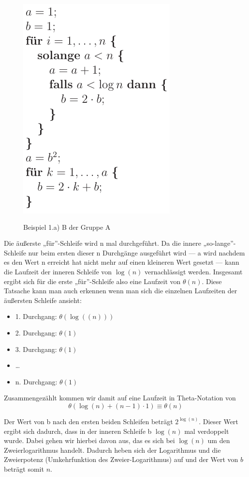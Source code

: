 \documentclass[a4paper, 12pt]{article}
\begin{document}
\begin{figure}[H]
	\caption{Beispiel 1.a) B der Gruppe A}
	\vskip 0.2cm
	\centering
	\includegraphics{Figures/Test_2008-11-07_1AaB}
	\label{figure:Test_2008-11-07_1AaB}
\end{figure}

Die äußerste „für”-Schleife wird n mal durchgeführt. Da die innere „so-lange”-Schleife nur beim ersten dieser n Durchgänge ausgeführt wird — a wird nachdem es den Wert n erreicht hat nicht mehr auf einen kleineren Wert gesetzt — kann die Laufzeit der inneren Schleife von $\log(n)$ vernachlässigt werden. Insgesamt ergibt sich für die erste „für”-Schleife also eine Laufzeit von $θ(n)$. Diese Tatsache kann man auch erkennen wenn man sich die einzelnen Laufzeiten der äußersten Schleife ansieht:

\begin{itemize}
	\item 1. Durchgang: $θ\left(\log(\left(n\right)) \right)$
	\item 2. Durchgang: $θ(1)$
	\item 3. Durchgang: $θ(1)$
	\item \dots
	\item n. Durchgang: $θ(1)$
\end{itemize}

Zusammengezählt kommen wir damit auf eine Laufzeit in Theta-Notation von \[θ\left(\log(n)+\left(n-1\right)⋅ 1\right) \equiv θ\left(n\right)\]

Der Wert von b nach den ersten beiden Schleifen beträgt $2^{\log(n)}$. Dieser Wert ergibt sich dadurch, dass in der inneren Schleife b $\log(n)$ mal verdoppelt wurde. Dabei gehen wir hierbei davon aus, das es sich bei $\log(n)$ um den Zweierlogarithmus handelt. Dadurch heben sich der Logarithmus und die Zweierpotenz (Umkehrfunktion des Zweier-Logarithmus) auf und der Wert von $b$ beträgt somit $n$.\\
\end{document}
